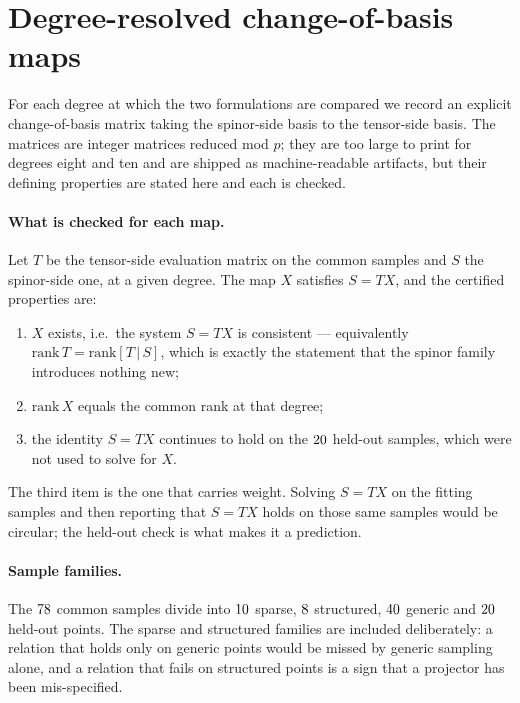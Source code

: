 \section{Degree-resolved change-of-basis maps}
\label{app:maps}

For each degree at which the two formulations are compared we record an explicit
change-of-basis matrix taking the spinor-side basis to the tensor-side basis. The
matrices are integer matrices reduced mod $p$; they are too large to print for
degrees eight and ten and are shipped as machine-readable artifacts, but their
defining properties are stated here and each is checked.

\paragraph{What is checked for each map.}
Let $T$ be the tensor-side evaluation matrix on the common samples and $S$ the
spinor-side one, at a given degree. The map $X$ satisfies $S = TX$, and the
certified properties are:
\begin{enumerate}\itemsep2pt
\item $X$ exists, i.e.\ the system $S = TX$ is consistent --- equivalently
      $\mathrm{rank}\,T = \mathrm{rank}[T\,|\,S]$, which is exactly the statement
      that the spinor family introduces nothing new;
\item $\mathrm{rank}\,X$ equals the common rank at that degree;
\item the identity $S = TX$ continues to hold on the $20$ held-out
      samples, which were not used to solve for $X$.
\end{enumerate}
The third item is the one that carries weight. Solving $S = TX$ on the fitting
samples and then reporting that $S = TX$ holds on those same samples would be
circular; the held-out check is what makes it a prediction.

\paragraph{Sample families.}
The $78$ common samples divide into $10$ sparse,
$8$ structured, $40$ generic and
$20$ held-out points. The sparse and structured families are
included deliberately: a relation that holds only on generic points would be
missed by generic sampling alone, and a relation that fails on structured points
is a sign that a projector has been mis-specified.

